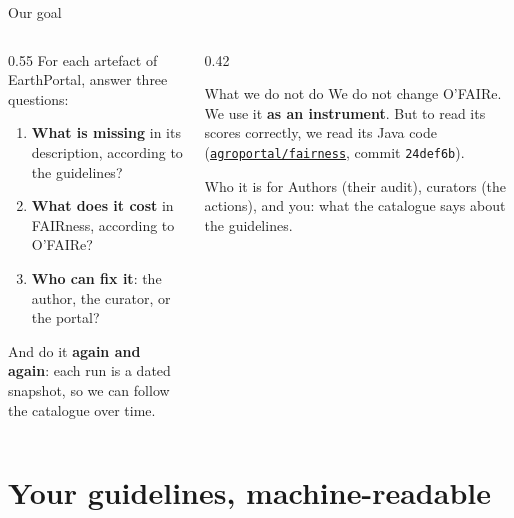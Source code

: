 \documentclass[aspectratio=169,10pt]{beamer}
\newcommand{\code}[1]{\texttt{\small #1}}
\begin{document}
\begin{frame}{Our goal}
  \begin{columns}[c]
    \begin{column}{0.55\textwidth}
      For each artefact of EarthPortal, answer three questions:
      \begin{enumerate}
        \item \textbf{What is missing} in its description, according to the guidelines?
        \item \textbf{What does it cost} in FAIRness, according to O'FAIRe?
        \item \textbf{Who can fix it}: the author, the curator, or the portal?
      \end{enumerate}
      \vspace{6pt}
      And do it \textbf{again and again}: each run is a dated snapshot, so we can follow the catalogue
      over time.
    \end{column}
    \begin{column}{0.42\textwidth}
      \begin{alertblock}{What we do not do}
        \small We do not change O'FAIRe. We use it \textbf{as an instrument}. But to read its scores
        correctly, we read its Java code
        (\href{https://github.com/agroportal/fairness/}{\code{agroportal/fairness}}, commit \code{24def6b}).
      \end{alertblock}
      \vspace{4pt}
      \begin{block}{Who it is for}
        \small Authors (their audit), curators (the actions), and you: what the catalogue says about
        the guidelines.
      \end{block}
    \end{column}
  \end{columns}
\end{frame}

\section{Your guidelines, machine-readable}
\end{document}
